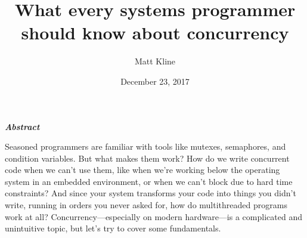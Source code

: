 \documentclass[fontsize=10pt, numbers=endperiod]{scrartcl}
\title{What every systems programmer should know about concurrency}
\author{Matt Kline}
\date{December 23, 2017}
\makeatletter
\let\runauthor\@author
\let\rundate\@date
\let\runtitle\@title
\makeatother
\begin{document}
\begin{center}
\sffamily\Large \textbf{\runtitle}
\bigskip

\large
\runauthor
\smallskip

\normalsize
\rundate
\end{center}
\bigskip

\begin{center}\begin{minipage}{0.7\linewidth}
\begin{center}
\large \bfseries\itshape Abstract
\end{center}

Seasoned programmers are familiar with tools like mutexes, semaphores,
and condition variables.
But what makes them work?
How do we write concurrent code when we can't use them,
like when we're working below the operating system in an embedded environment,
or when we can't block due to hard time constraints?
And since your system transforms your code into things you didn't write,
running in orders you never asked for, how do multithreaded programs work at all?
Concurrency---especially on modern hardware---is a complicated and unintuitive
topic, but let's try to cover some fundamentals.
\bigskip

\tableofcontents
\end{minipage}\end{center}
\medskip
\end{document}
